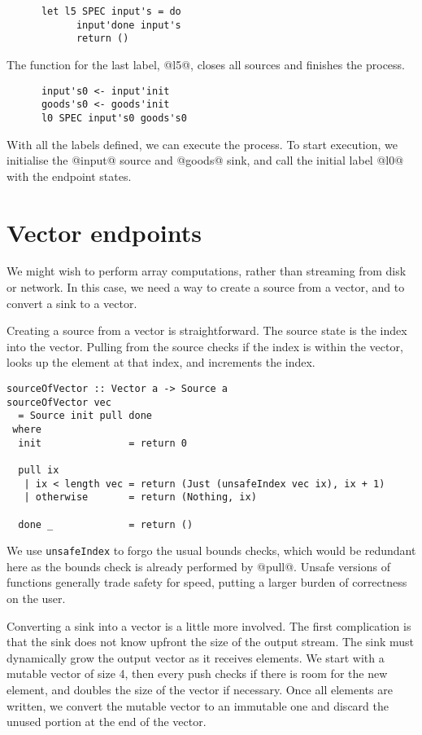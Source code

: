 \begin{lstlisting}
      let l5 SPEC input's = do
            input'done input's
            return ()
\end{lstlisting}

The function for the last label, @l5@, closes all sources and finishes the process.

\begin{lstlisting}
      input's0 <- input'init
      goods's0 <- goods'init
      l0 SPEC input's0 goods's0
\end{lstlisting}

With all the labels defined, we can execute the process.
To start execution, we initialise the @input@ source and @goods@ sink, and call the initial label @l0@ with the endpoint states.

\section{Vector endpoints}

We might wish to perform array computations, rather than streaming from disk or network.
In this case, we need a way to create a source from a vector, and to convert a sink to a vector.

Creating a source from a vector is straightforward.
The source state is the index into the vector.
Pulling from the source checks if the index is within the vector, looks up the element at that index, and increments the index.

\begin{lstlisting}
sourceOfVector :: Vector a -> Source a
sourceOfVector vec
  = Source init pull done
 where
  init               = return 0

  pull ix
   | ix < length vec = return (Just (unsafeIndex vec ix), ix + 1)
   | otherwise       = return (Nothing, ix)

  done _             = return ()
\end{lstlisting}

We use \lstinline/unsafeIndex/ to forgo the usual bounds checks, which would be redundant here as the bounds check is already performed by @pull@.
Unsafe versions of functions generally trade safety for speed, putting a larger burden of correctness on the user.

Converting a sink into a vector is a little more involved.
The first complication is that the sink does not know upfront the size of the output stream.
The sink must dynamically grow the output vector as it receives elements.
We start with a mutable vector of size 4, then every push checks if there is room for the new element, and doubles the size of the vector if necessary.
Once all elements are written, we convert the mutable vector to an immutable one and discard the unused portion at the end of the vector.


